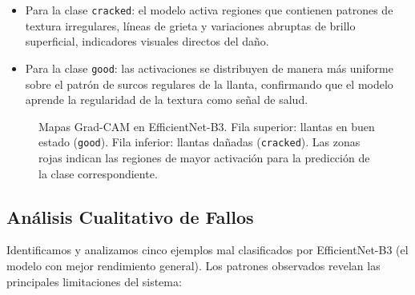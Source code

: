 \documentclass{article}
\begin{document}
\begin{itemize}
  \item Para la clase \texttt{cracked}: el modelo activa regiones que contienen 
        patrones de textura irregulares, líneas de grieta y variaciones abruptas 
        de brillo superficial, indicadores visuales directos del daño.
  \item Para la clase \texttt{good}: las activaciones se distribuyen de manera 
        más uniforme sobre el patrón de surcos regulares de la llanta, confirmando 
        que el modelo aprende la regularidad de la textura como señal de salud.
\end{itemize}

\begin{figure}[H]
  \centering
  \fbox{\rule{0pt}{3cm}\rule{0.9\linewidth}{0pt}}
  \caption{Mapas Grad-CAM en EfficientNet-B3. Fila superior: llantas en buen estado 
           (\texttt{good}). Fila inferior: llantas dañadas (\texttt{cracked}). 
           Las zonas rojas indican las regiones de mayor activación para la predicción 
           de la clase correspondiente.}
  \label{fig:gradcam}
\end{figure}

\subsection{Análisis Cualitativo de Fallos}
\label{ssec:failures}

Identificamos y analizamos cinco ejemplos mal clasificados por EfficientNet-B3 
(el modelo con mejor rendimiento general). Los patrones observados revelan las 
principales limitaciones del sistema:
\end{document}
